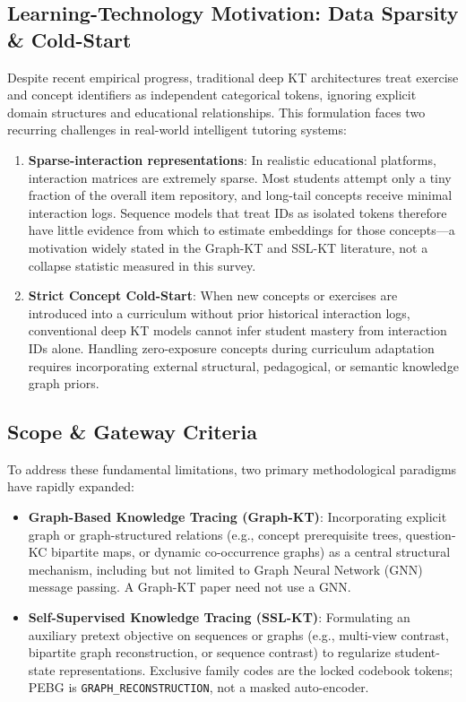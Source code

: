 \documentclass[lettersize,journal]{IEEEtran}
\begin{document}
\subsection{Learning-Technology Motivation: Data Sparsity \& Cold-Start}
Despite recent empirical progress, traditional deep KT architectures treat exercise and concept identifiers as independent categorical tokens, ignoring explicit domain structures and educational relationships. This formulation faces two recurring challenges in real-world intelligent tutoring systems:
\begin{enumerate}
    \item \textbf{Sparse-interaction representations}: In realistic educational platforms, interaction matrices are extremely sparse. Most students attempt only a tiny fraction of the overall item repository, and long-tail concepts receive minimal interaction logs. Sequence models that treat IDs as isolated tokens therefore have little evidence from which to estimate embeddings for those concepts---a motivation widely stated in the Graph-KT and SSL-KT literature, not a collapse statistic measured in this survey.
    \item \textbf{Strict Concept Cold-Start}: When new concepts or exercises are introduced into a curriculum without prior historical interaction logs, conventional deep KT models cannot infer student mastery from interaction IDs alone. Handling zero-exposure concepts during curriculum adaptation requires incorporating external structural, pedagogical, or semantic knowledge graph priors.
\end{enumerate}

\subsection{Scope \& Gateway Criteria}
To address these fundamental limitations, two primary methodological paradigms have rapidly expanded:
\begin{itemize}
    \item \textbf{Graph-Based Knowledge Tracing (Graph-KT)}: Incorporating explicit graph or graph-structured relations (e.g., concept prerequisite trees, question-KC bipartite maps, or dynamic co-occurrence graphs) as a central structural mechanism, including but not limited to Graph Neural Network (GNN) message passing. A Graph-KT paper need not use a GNN.
    \item \textbf{Self-Supervised Knowledge Tracing (SSL-KT)}: Formulating an auxiliary pretext objective on sequences or graphs (e.g., multi-view contrast, bipartite graph reconstruction, or sequence contrast) to regularize student-state representations. Exclusive family codes are the locked codebook tokens; PEBG is \texttt{GRAPH\_RECONSTRUCTION}, not a masked auto-encoder.
\end{itemize}
\end{document}
